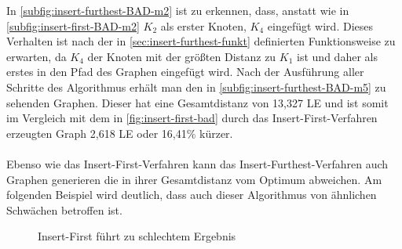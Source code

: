 In \vref{subfig:insert-furthest-BAD-m2} ist zu erkennen, dass, anstatt wie in \vref{subfig:insert-first-BAD-m2} $K_2$ als erster Knoten, $K_4$ eingefügt wird.
Dieses Verhalten ist nach der in \vref{sec:insert-furthest-funkt} definierten Funktionsweise zu erwarten, da $K_4$ der Knoten mit der größten Distanz zu $K_1$ ist und daher als erstes in den Pfad des Graphen eingefügt wird.
Nach der Ausführung aller Schritte des Algorithmus erhält man den in \vref{subfig:insert-furthest-BAD-m5} zu sehenden Graphen.
Dieser hat eine Gesamtdistanz von 13,327 \ac{LE} und ist somit im Vergleich mit dem in \vref{fig:insert-first-bad} durch das Insert-First-Verfahren erzeugten Graph 2,618 \ac{LE} oder 16,41\% kürzer.
\\\\
Ebenso wie das Insert-First-Verfahren kann das Insert-Furthest-Verfahren auch Graphen generieren die in ihrer Gesamtdistanz vom Optimum abweichen. Am folgenden Beispiel wird deutlich, dass auch dieser Algorithmus von ähnlichen Schwächen betroffen ist.
\begin{figure}[H]
    \begin{center}
        \hfil
        \caption{Insert-First führt zu schlechtem Ergebnis}
        \label{fig:insert-furthest-bad}
    \end{center}
\end{figure}
